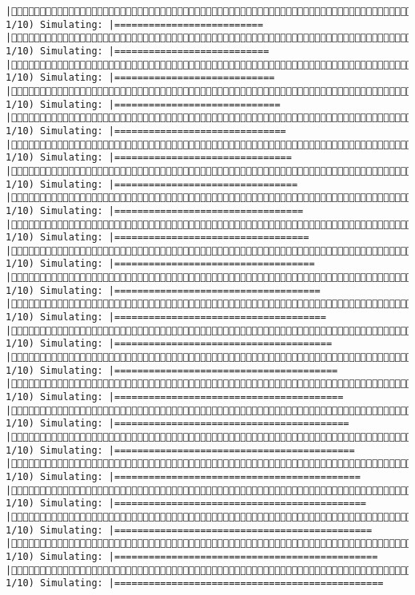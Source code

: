 \documentclass[]{article}
\begin{document}
\begin{verbatim}
|( 1/10) Simulating: |==========================                           |( 1/10) Simulating: |===========================                          |( 1/10) Simulating: |============================                         |( 1/10) Simulating: |=============================                        |( 1/10) Simulating: |==============================                       |( 1/10) Simulating: |===============================                      |( 1/10) Simulating: |================================                     |( 1/10) Simulating: |=================================                    |( 1/10) Simulating: |==================================                   |( 1/10) Simulating: |===================================                  |( 1/10) Simulating: |====================================                 |( 1/10) Simulating: |=====================================                |( 1/10) Simulating: |======================================               |( 1/10) Simulating: |=======================================              |( 1/10) Simulating: |========================================             |( 1/10) Simulating: |=========================================            |( 1/10) Simulating: |==========================================           |( 1/10) Simulating: |===========================================          |( 1/10) Simulating: |============================================         |( 1/10) Simulating: |=============================================        |( 1/10) Simulating: |==============================================       |( 1/10) Simulating: |===============================================      
\end{verbatim}
\end{document}
